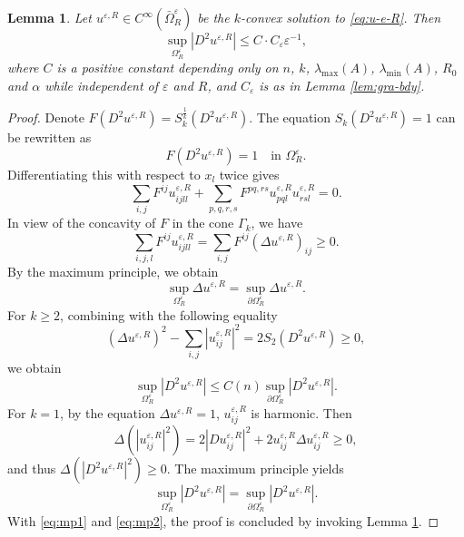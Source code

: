 \documentclass[reqno]{amsart}
\newtheorem{lemma}[theorem]{Lemma}
\theoremstyle{remark}
\theoremstyle{definition}
\numberwithin{equation}{section}
\begin{document}
\begin{lemma}\label{lem:C2-est}
	Let $u^{\varepsilon,R}\in C^\infty(\bar{\Omega}_R^\varepsilon)$ be the $k$-convex solution to \eqref{eq:u-e-R}. Then
	\[
	\sup_{\Omega_R^\varepsilon}|D^2u^{\varepsilon,R}|\leq C\cdot C_\varepsilon\varepsilon^{-1},
	\]
	where $C$ is a positive constant depending only on $n$, $k$, $\lambda_{\mathrm{max}}(A)$, $\lambda_{\mathrm{min}}(A)$, $R_0$ and $\alpha$ while independent of $\varepsilon$ and $R$, and $C_\varepsilon$ is as in Lemma \ref{lem:gra-bdy}.
\end{lemma}
\begin{proof}
	Denote \( F(D^2u^{\varepsilon,R}) = S_k^{\frac{1}{k}} (D^2u^{\varepsilon,R}) \). The equation $S_k(D^2u^{\varepsilon,R})=1$ can be rewritten as  
	\[ 
	F(D^2u^{\varepsilon,R}) = 1 \quad \text{in } \Omega_R^\varepsilon. 
	\]  
	Differentiating this with respect to $x_l$ twice gives  
	\[ 
	\sum_{i,j}F^{ij} u^{\varepsilon,R}_{ijll} + \sum_{p,q,r,s}F^{pq,rs} u^{\varepsilon,R}_{pql} u^{\varepsilon,R}_{rsl} = 0. 
	\]  
	In view of the concavity of \( F \)  in the cone $\Gamma_k$, we have 
	\[ 
	\sum_{i,j,l}F^{ij} u^{\varepsilon,R}_{ijll} = \sum_{i,j}F^{ij} (\Delta u^{\varepsilon,R})_{ij} \geq 0. 
	\]  
	By the maximum principle, we obtain  
	\[ 
	\sup_{\Omega_R^\varepsilon} \Delta u^{\varepsilon,R} = \sup_{\partial \Omega_R^\varepsilon} \Delta u^{\varepsilon,R}. 
	\]
	For $k\geq2$, combining with the following equality
	\[
	(\Delta u^{\varepsilon,R})^2 - \sum_{i,j} |u^{\varepsilon,R}_{ij}|^2 = 2S_2(D^2u^{\varepsilon,R}) \geq 0,
	\]
	we obtain
	\begin{equation}\label{eq:mp1}
	\sup_{\Omega_R^\varepsilon}|D^2u^{\varepsilon,R}|\leq C(n)\sup_{\partial \Omega_R^\varepsilon} |D^2u^{\varepsilon,R}|.
	\end{equation}
	For $k=1$, by the equation $\Delta u^{\varepsilon,R}=1$, $u^{\varepsilon,R}_{ij}$ is harmonic. Then
	$$\Delta(|u^{\varepsilon,R}_{ij}|^2)=2|Du^{\varepsilon,R}_{ij}|^2+2u^{\varepsilon,R}_{ij}\Delta u^{\varepsilon,R}_{ij}\geq0,$$
	and thus $\Delta(|D^2u^{\varepsilon,R} |^2)\geq0$.
	The maximum principle yields
	\begin{equation}\label{eq:mp2}
	\sup_{\Omega_R^\varepsilon}|D^2u^{\varepsilon,R}|=\sup_{\partial \Omega_R^\varepsilon} |D^2u^{\varepsilon,R}|.
	\end{equation}
	With \eqref{eq:mp1} and \eqref{eq:mp2}, the proof is concluded by invoking Lemma \ref{lem:C2-est}.
\end{proof}
\end{document}
